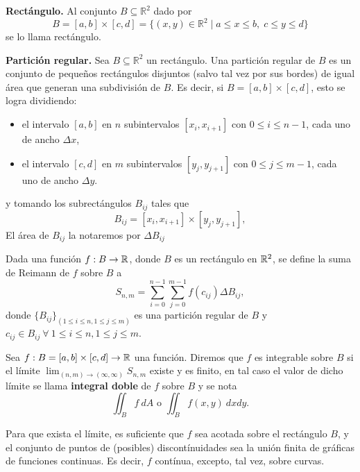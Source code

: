\begin{definition}  \textbf{Rect\'angulo.} Al conjunto \( B  \subseteq  \mathbb{R}^2 \) dado por
	\[
	B = [a, b] \times [c, d] = \{(x, y) \in \mathbb{R}^2 \mid a \leq x \leq b, \; c \leq y \leq d\}
	\]
	se lo llama rect\'angulo.   
\end{definition}	

\begin{definition} \textbf{Partici\'on regular.} 	Sea \( B  \subseteq  \mathbb{R}^2 \) un rect\'angulo.  Una partición regular de $B$ es un conjunto de pequeños rectángulos disjuntos (salvo tal vez por sus bordes)  de igual \'area que  generan una subdivisi\'on de $B$.  Es decir, si $B = [a, b] \times [c, d]$,  esto se logra dividiendo:
	
	\begin{itemize}
		\item el intervalo \( [a, b] \) en \( n \) subintervalos \( [x_i, x_{i+1}] \) con $0 \leq  i \leq n-1$, cada uno de ancho \( \Delta x \),
		\item el intervalo \( [c, d] \) en \( m \) subintervalos \( [y_j, y_{j+1}] \) con $0 \leq  j \leq m-1$, cada uno de ancho \( \Delta y \).
	\end{itemize}
y tomando los subrect\'angulos $B_{ij}$ tales que
	\[
	B_{ij} = [x_i, x_{i+1}] \times [y_j, y_{j+1}], 
	\]  El \'area de $ B_{ij}$ la notaremos por $\Delta B_{ij}$ 
\end{definition}


\begin{definition}
Dada una funci\'on $f:B\to\mathbb{R}$, donde $B$ es un rect\'angulo en $\mathbb{R}^2$, se define la suma de Reimann de $f$ sobre $B$ a 
\[
    S_{n,m}=\sum_{i=0}^{n-1}\sum_{j=0}^{m-1} f(c_{ij})\Delta B_{ij},
\]  
donde $\{ B_{ij}\}_{( 1 \leq i \leq n, 1 \leq j \leq m )}$ es una partici\'on regular de $B$ y  $c_{ij}\in B_{ij} \: \forall \: 1 \leq i \leq n, 1 \leq j \leq m$. 
\end{definition}

\begin{definition} 
    Sea $f:B=[a,b]\times[c,d]\to\mathbb{R}$ una funci\'on. Diremos que $f$ es integrable sobre $B$ si  el l\'imite $\lim_{(n,m)\to (\infty,\infty)}S_{n,m}$  existe y es finito, en tal caso el valor de dicho  l\'imite  se llama \textbf{integral doble} de $f$ sobre $B$ y se nota 
    \[
          \iint_B f\:dA  \mbox{ o } \iint_B f(x,y)\:dxdy.
    \]
\end{definition}

\begin{obs}
Para que exista el límite,  es suficiente que $f$ sea acotada sobre el rectángulo $B$, y el conjunto de puntos de (posibles) discontínuidades  sea la unión finita de gráficas
de funciones continuas. Es decir, $f$ contínua, excepto, tal vez, sobre curvas.
\end{obs}

